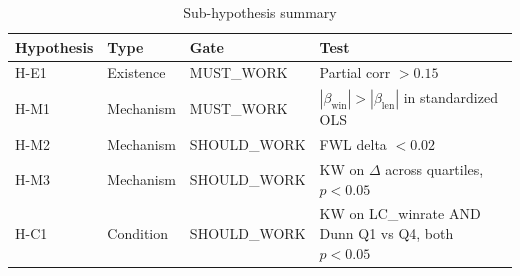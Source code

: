\begin{table}[h]
\centering
\caption{Sub-hypothesis summary}
\label{tab:hypotheses}
\begin{tabular}{llll}
\toprule
Hypothesis & Type & Gate & Test \\
\midrule
H-E1 & Existence & MUST\_WORK & Partial corr $> 0.15$ \\
H-M1 & Mechanism & MUST\_WORK & $|\beta_{\mathrm{win}}| > |\beta_{\mathrm{len}}|$ in standardized OLS \\
H-M2 & Mechanism & SHOULD\_WORK & FWL delta $< 0.02$ \\
H-M3 & Mechanism & SHOULD\_WORK & KW on $\Delta$ across quartiles, $p < 0.05$ \\
H-C1 & Condition & SHOULD\_WORK & KW on LC\_winrate AND Dunn Q1 vs Q4, both $p < 0.05$ \\
\bottomrule
\end{tabular}
\end{table}
